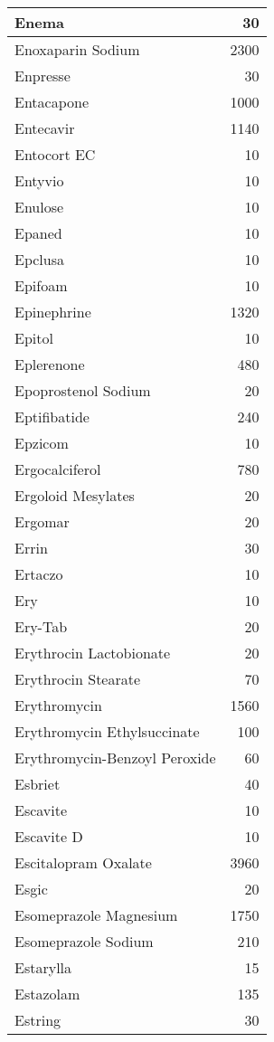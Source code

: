 \documentclass[
]{article}
\begin{document}
\begin{table}
\begin{tabular}[t]{l|r}
\hline
Enema & 30\\
\hline
Enoxaparin Sodium & 2300\\
\hline
Enpresse & 30\\
\hline
Entacapone & 1000\\
\hline
Entecavir & 1140\\
\hline
Entocort EC & 10\\
\hline
Entyvio & 10\\
\hline
Enulose & 10\\
\hline
Epaned & 10\\
\hline
Epclusa & 10\\
\hline
Epifoam & 10\\
\hline
Epinephrine & 1320\\
\hline
Epitol & 10\\
\hline
Eplerenone & 480\\
\hline
Epoprostenol Sodium & 20\\
\hline
Eptifibatide & 240\\
\hline
Epzicom & 10\\
\hline
Ergocalciferol & 780\\
\hline
Ergoloid Mesylates & 20\\
\hline
Ergomar & 20\\
\hline
Errin & 30\\
\hline
Ertaczo & 10\\
\hline
Ery & 10\\
\hline
Ery-Tab & 20\\
\hline
Erythrocin Lactobionate & 20\\
\hline
Erythrocin Stearate & 70\\
\hline
Erythromycin & 1560\\
\hline
Erythromycin Ethylsuccinate & 100\\
\hline
Erythromycin-Benzoyl Peroxide & 60\\
\hline
Esbriet & 40\\
\hline
Escavite & 10\\
\hline
Escavite D & 10\\
\hline
Escitalopram Oxalate & 3960\\
\hline
Esgic & 20\\
\hline
Esomeprazole Magnesium & 1750\\
\hline
Esomeprazole Sodium & 210\\
\hline
Estarylla & 15\\
\hline
Estazolam & 135\\
\hline
Estring & 30\\

\end{tabular}
\end{table}
\end{document}
